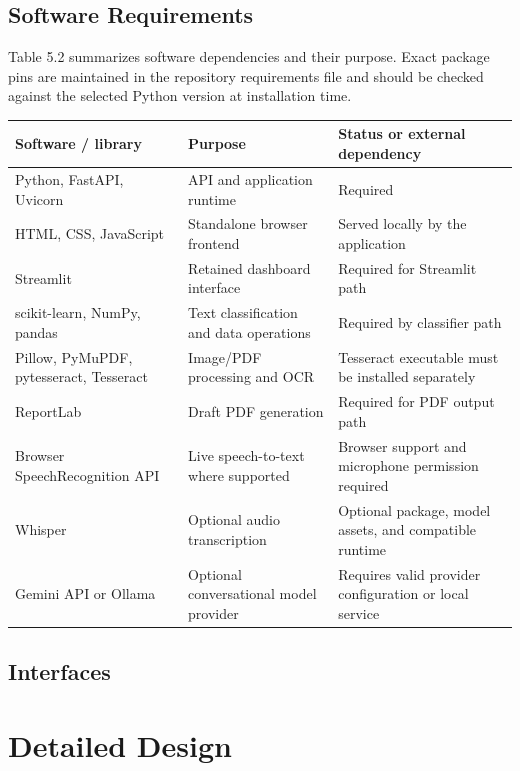 \documentclass[12pt,a4paper,oneside]{report}
\begin{document}
\section{Software Requirements}
Table 5.2 summarizes software dependencies and their purpose. Exact package pins are maintained in the repository requirements file and should be checked against the selected Python version at installation time.\par\medskip
{}
\begin{longtable}{|>{\RaggedRight\arraybackslash}p{}|>{\RaggedRight\arraybackslash}p{}|>{\RaggedRight\arraybackslash}p{}|}
\hline
\textbf{Software / library} & \textbf{Purpose} & \textbf{Status or external dependency} \\\hline
Python, FastAPI, Uvicorn & API and application runtime & Required \\\hline
HTML, CSS, JavaScript & Standalone browser frontend & Served locally by the application \\\hline
Streamlit & Retained dashboard interface & Required for Streamlit path \\\hline
scikit-learn, NumPy, pandas & Text classification and data operations & Required by classifier path \\\hline
Pillow, PyMuPDF, pytesseract, Tesseract & Image/PDF processing and OCR & Tesseract executable must be installed separately \\\hline
ReportLab & Draft PDF generation & Required for PDF output path \\\hline
Browser SpeechRecognition API & Live speech-to-text where supported & Browser support and microphone permission required \\\hline
Whisper & Optional audio transcription & Optional package, model assets, and compatible runtime \\\hline
Gemini API or Ollama & Optional conversational model provider & Requires valid provider configuration or local service \\\hline
\end{longtable}
\vspace{2mm}
\section{Interfaces}
\clearpage\chapter{Detailed Design}
\end{document}
